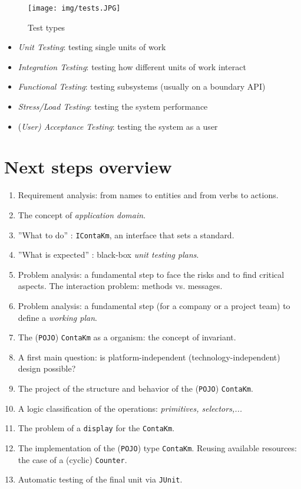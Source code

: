 \documentclass{llncs}
\newcommand{\pojo}{\texttt{POJO}}
\newcommand{\junit}{\texttt{JUnit}}
\newcommand{\labelsec}[1]{\label{sec:#1}}
\newcommand{\labelfig}[1]{\label{fig:#1}}
\begin{document}
\begin{figure}
    \centering
   \texttt{[image: img/tests.JPG]}\\
  \caption{Test types}\labelfig{testTypes}
\end{figure}

\begin{itemize}
  \item \emph{Unit Testing}: testing single units of work
  \item \emph{Integration Testing}: testing how different units of work interact
  \item \emph{Functional Testing}: testing subsystems (usually on a boundary API)
  \item \emph{Stress/Load Testing}: testing the system performance
  \item (\emph{User) Acceptance Testing}: testing the system as a user
\end{itemize}


\section{Next steps overview}
\labelsec{next}
\begin{enumerate}
  \item Requirement analysis: from names to entities and from verbs to actions.
  \item The concept of \emph{application domain}.
  \item ''What to do'' :  \texttt{IContaKm}, an interface that sets a standard.
  \item ''What is expected'' : black-box  \emph{unit testing plans}.
  \item Problem analysis: a fundamental step to face the risks and to find critical aspects. The interaction problem: methods vs. messages.
  \item Problem analysis: a fundamental step (for a company or a project team) to define a \emph{working plan}.
  \item The (\pojo) \texttt{ContaKm} as a organism: the concept of invariant.
  \item A first main question: is platform-independent (technology-independent) design possible?
  \item The project of the structure and behavior of the (\pojo) \texttt{ContaKm}.
   \item A logic classification of the operations: \emph{primitives, selectors,...}
  \item The problem of a \texttt{display} for the \texttt{ContaKm}.
  \item The implementation of the (\pojo) type \texttt{ContaKm}. Reusing available resources: the case of a (cyclic) \texttt{Counter}.
  \item Automatic testing of the final unit via \junit.
\end{enumerate}


\appendix




\end{document}
